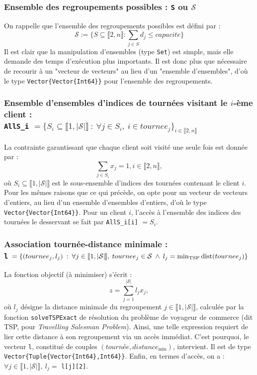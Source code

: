 \documentclass[french, 11pt, a4paper]{article} %
\newcommand{\Sc}{\mathcal{S}} %
\newcommand{\smb}{\smallbreak}
\begin{document}
\subsubsection{Ensemble des regroupements possibles : \texttt{S} ou $\Sc$}
On rappelle que l'ensemble des regroupements possibles est défini par :
\[\Sc := \Bigg\{ S \subseteq \llbracket 2,n \rrbracket : \sum_{j \in S} d_j \leq capacite \Bigg\} \]
\smb Il est clair que la manipulation d'ensembles (type \verb+Set+) est simple, mais elle demande des temps d'exécution plus importants.
Il est donc plus que nécessaire de recourir à un "vecteur de vecteurs" au lieu d'un "ensemble d'ensembles", d'où
le type \verb+Vector{Vector{Int64}}+ pour l'ensemble des regroupements.

\subsubsection{Ensemble d'ensembles d'indices de tournées visitant le $i$-ème client : \\ \texttt{AllS\_i} $= \{S_i \subseteq \llbracket 1, |\Sc| \rrbracket \: : \: \forall j \in S_i, \: i \in tournee_j\}_{i \in \llbracket 2 , n \rrbracket }$ }
La contrainte garantissant que chaque client soit visité une seule fois est donnée par :
\[ \sum_{j \in S_i} x_j = 1, i \in \llbracket 2,n \rrbracket, \]
où $S_i \subseteq \llbracket 1, |\Sc| \rrbracket$ est le sous-ensemble d'indices des tournées
contenant le client $i$.
Pour les mêmes raisons que ce qui précède, on opte pour un vecteur de vecteurs d'entiers, au lieu d'un ensemble d'ensembles d'entiers,
d'où le type \verb+Vector{Vector{Int64}}+.
\smb Pour un client $i$, l'accès à l'ensemble des indices des tournées le desservant se fait par \texttt{AllS\_i[i]} $=S_i$.

\subsubsection{Association tournée-distance minimale : \\ \texttt{l} 
$= \{(tournee_j,l_j) \: : \: \forall j \in \llbracket 1,|\Sc| \hspace{-0.15cm} \rrbracket,  \:
tournee_j \in \Sc 
\: \land \:
l_j = \min_{\text{\normalfont{TSP}}} \text{\normalfont{dist}}(tournee_j) \}$}

La fonction objectif (à minimiser) s'écrit :
\[ z = \sum_{j=1}^{|\Sc|} l_j x_j,\]
où $l_j$ désigne la distance minimale du regroupement $j \in \llbracket 1,|\Sc| \rrbracket$, calculée par la
fonction \verb+solveTSPExact+ de résolution du problème de voyageur de commerce (dit TSP, pour \emph{Travelling Salesman Problem}).
Ainsi, une telle expression requiert de lier cette distance à son regroupement via un accès immédiat.
C'est pourquoi, le vecteur \verb+l+, constitué de couples $(tourn \text{é} e,distance_{\text{min}})$, intervient.
Il est de type \verb+Vector{Tuple{Vector{Int64},Int64}}+.
\smb Enfin, en termes d'accès, on a : $\forall j \in \llbracket 1,|\Sc| \rrbracket, \: l_j = $ \texttt{l[j][2]}.
\end{document}
